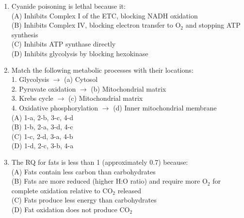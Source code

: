 \documentclass{article}
\begin{document}
\begin{enumerate}[label=Q\arabic*.]
\item Cyanide poisoning is lethal because it:
\\(A) Inhibits Complex I of the ETC, blocking NADH oxidation
\\(B) Inhibits Complex IV, blocking electron transfer to O$_2$ and stopping ATP synthesis
\\(C) Inhibits ATP synthase directly
\\(D) Inhibits glycolysis by blocking hexokinase

\item Match the following metabolic processes with their locations:\\
1. Glycolysis $\rightarrow$ (a) Cytosol\\
2. Pyruvate oxidation $\rightarrow$ (b) Mitochondrial matrix\\
3. Krebs cycle $\rightarrow$ (c) Mitochondrial matrix\\
4. Oxidative phosphorylation $\rightarrow$ (d) Inner mitochondrial membrane
\\(A) 1-a, 2-b, 3-c, 4-d
\\(B) 1-b, 2-a, 3-d, 4-c
\\(C) 1-c, 2-d, 3-a, 4-b
\\(D) 1-d, 2-c, 3-b, 4-a

\item The RQ for fats is less than 1 (approximately 0.7) because:
\\(A) Fats contain less carbon than carbohydrates
\\(B) Fats are more reduced (higher H:O ratio) and require more O$_2$ for complete oxidation relative to CO$_2$ released
\\(C) Fats produce less energy than carbohydrates
\\(D) Fat oxidation does not produce CO$_2$

\end{enumerate}
\end{document}
